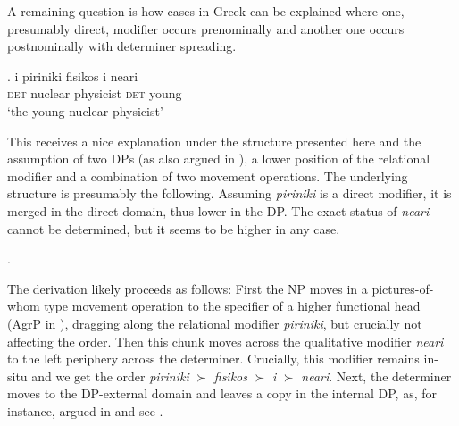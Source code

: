 \documentclass [output=book,colorlinks,citecolor=brown]{langscibook}
\begin{document}
A remaining question is how cases in Greek can be explained where one, presumably direct, modifier occurs prenominally and another one occurs postnominally with determiner spreading.

\exg. i piriniki fisikos i neari\\
\textsc{det} nuclear physicist \textsc{det} young\\
`the young nuclear physicist’

This receives a nice explanation under the structure presented here and the assumption of two DPs (as also argued in \citealt{laenzlinger:2011:elements}), a lower position of the relational modifier and a combination of two movement operations. The underlying structure is presumably the following. Assuming \textit{piriniki} is a direct modifier, it is merged in the direct domain, thus lower in the DP. The exact status of \textit{neari} cannot be determined, but it seems to be higher in any case. %

\newpage

\ex. 

The derivation likely proceeds as follows: First the NP moves in a pictures-of-whom type movement operation to the specifier of a higher functional head (AgrP in \citealt{cinque:2017:micro, cinque:2023:linearization}), dragging along the relational modifier \textit{piriniki}, but crucially not affecting the order. Then this chunk moves across the qualitative modifier \textit{neari} to the left periphery across the determiner. Crucially, this modifier remains in-situ and we get the order \textit{piriniki} $\succ$ \textit{fisikos} $\succ$ \textit{i} $\succ$ \textit{neari}. Next, the determiner moves to the DP-external domain and leaves a copy in the internal DP, as, for instance, argued in \citet{laenzlinger:2011:elements} and see \citet{grohmann:2003:prolific, grohmann:2015:demonstrative}. %
\end{document}
